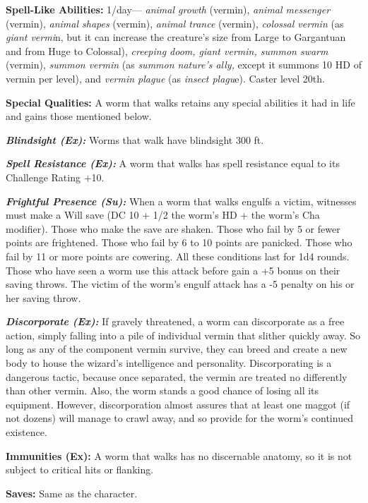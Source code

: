 \documentclass{article}
\begin{document}
{\textbf{Spell-Like Abilities: }1/day--- \textit{animal growth }(vermin), \textit{animal 
messenger }(vermin), \textit{animal shapes }(vermin), \textit{animal trance }(vermin), 
\textit{colossal vermin }(as \textit{giant vermi}n, but it can increase the creature's 
size from Large to Gargantuan and from Huge to Colossal), \textit{creeping doom, 
giant vermin, summon swarm }(vermin), \textit{summon vermin }(as \textit{summon 
nature's ally, }except it summons 10 HD of vermin per level), and \textit{vermin 
plague }(as \textit{insect plagu}e). Caster level 20th. 

\textbf{Special Qualities:} A worm that walks retains any special abilities it 
had in life and gains those mentioned below. 

\textit{\textbf{Blindsight (Ex):}}\textit{ }Worms that walk have blindsight 300 
ft. 

\textit{\textbf{Spell Resistance (Ex):}}\textit{ }A worm that walks has spell resistance 
equal to its Challenge Rating +10. 

\textit{\textbf{Frightful Presence (Su):}}\textit{ }When a worm that walks engulfs 
a victim, witnesses must make a Will save (DC 10 + 1/2 the worm's HD + the worm's 
Cha modifier). Those who make the save are shaken. Those who fail by 5 or fewer 
points are frightened. Those who fail by 6 to 10 points are panicked. Those who 
fail by 11 or more points are cowering. All these conditions last for 1d4 rounds. 
Those who have seen a worm use this attack before gain a +5 bonus on their saving 
throws. The victim of the worm's engulf attack has a -5 penalty on his or her saving 
throw. 

\textit{\textbf{Discorporate (Ex):}}\textit{ }If gravely threatened, a worm can 
discorporate as a free action, simply falling into a pile of individual vermin 
that slither quickly away. So long as any of the component vermin survive, they 
can breed and create a new body to house the wizard's intelligence and personality. 
Discorporating is a dangerous tactic, because once separated, the vermin are treated 
no differently than other vermin. Also, the worm stands a good chance of losing 
all its equipment. However, discorporation almost assures that at least one maggot 
(if not dozens) will manage to crawl away, and so provide for the worm's continued 
existence. 

\textbf{Immunities (Ex): }A worm that walks has no discernable anatomy, so it is 
not subject to critical hits or flanking.

\textbf{Saves:} Same as the character. 

}
\end{document}
